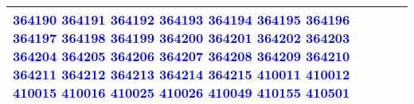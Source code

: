 {\begin{tabular}{|l|p{10cm}|}
\textcolor{blue}{364190} \textcolor{blue}{364191} \textcolor{blue}{364192} \textcolor{blue}{364193} \textcolor{blue}{364194} \textcolor{blue}{364195} \textcolor{blue}{364196} \textcolor{blue}{364197} \textcolor{blue}{364198} \textcolor{blue}{364199} \textcolor{blue}{364200} \textcolor{blue}{364201} \textcolor{blue}{364202} \textcolor{blue}{364203} \textcolor{blue}{364204} \textcolor{blue}{364205} \textcolor{blue}{364206} \textcolor{blue}{364207} \textcolor{blue}{364208} \textcolor{blue}{364209} \textcolor{blue}{364210} \textcolor{blue}{364211} \textcolor{blue}{364212} \textcolor{blue}{364213} \textcolor{blue}{364214} \textcolor{blue}{364215} \textcolor{blue}{410011} \textcolor{blue}{410012} \textcolor{blue}{410015} \textcolor{blue}{410016} \textcolor{blue}{410025} \textcolor{blue}{410026} \textcolor{blue}{410049} \textcolor{blue}{410155} \textcolor{blue}{410501} \\
\hline
\end{tabular}}
